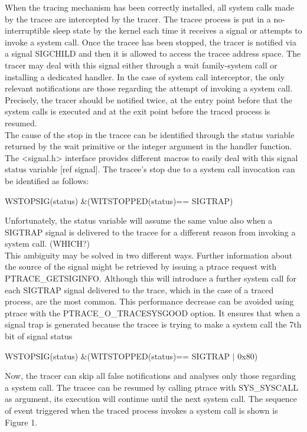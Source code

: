 When the tracing mechanism has been correctly installed, all system calls made by the tracee are intercepted by the tracer. The tracee process is put in a no-interruptible sleep state by the kernel each time it receives a signal or attempts to invoke a system call.  Once the tracee has been stopped, the tracer is notified via a signal SIGCHILD and then it is allowed to access the tracee address space.  The tracer may deal with this signal either through a wait family-system call or installing a dedicated handler. 
In the case of system call interceptor, the only relevant notifications are those regarding the attempt of invoking a system call. Precisely, the tracer should be notified twice, at the entry point before that the system calls is executed and at the exit point before the traced process is resumed. \\
The cause of the stop in the tracee can be identified through the status variable returned by the wait primitive or the integer argument in the handler function.  The <signal.h> interface provides different macros to easily deal with this signal status variable [ref signal]. The tracee’s stop due to a system call invocation can be identified as follows: 
\begin{center}
WSTOPSIG(status) \&(WITSTOPPED(status)== SIGTRAP) 
\end{center}
Unfortunately, the status variable will assume the same value also when a SIGTRAP signal is delivered to the tracee for a different reason from invoking a system call. (WHICH?) \\
This ambiguity may be solved in two different ways. Further information about the source of the signal might be retrieved by issuing a ptrace request with PTRACE\_GETSIGINFO.  Although this will introduce a further system call for each SIGTRAP signal delivered to the trace, which in the case of a traced process, are the most common.  This performance decrease can be avoided using ptrace with the PTRACE\_O\_TRACESYSGOOD option. It ensures that when a signal trap is generated because the tracee is trying to make a system call the 7th bit of signal status \begin{center}
WSTOPSIG(status) \&(WITSTOPPED(status)== SIGTRAP $|$ 0x80)
\end{center}
Now, the tracer can skip all false notifications and analyses only those regarding a system call. The tracee can be resumed by calling ptrace with SYS\_SYSCALL as argument, its execution will continue until the next system call.  The sequence of event triggered when the traced process invokes a system call is shown is Figure 1.  \\

